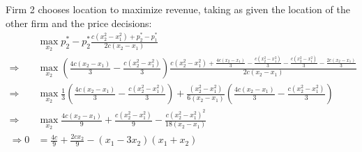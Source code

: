 \documentclass[11pt]{article} %
\begin{document}
Firm 2 chooses location to maximize revenue, taking as given the location of the other firm and the price decisions:
\begin{align*}
&\max_{x_2}  p_2^{*}-p_2^{*}\frac{c(x_2^2 - x_1^2) + p_2^{*} - p_1^{*}}{2c(x_2 - x_1)}\\
\Rightarrow&\max_{x_2}  \left(\frac{4c(x_2 - x_1)}{3} - \frac{c(x_2^2 - x_1^2)}{3}\right)\frac{c(x_2^2 - x_1^2) +  \frac{4c(x_2 - x_1)}{3} - \frac{c(x_2^2 - x_1^2)}{3} - \frac{c(x_2^2 - x_1^2)}{3} - \frac{2c(x_2 - x_1)}{3}}{2c(x_2 - x_1)}\\
\Rightarrow&\max_{x_2}  \frac{1}{3}\left(\frac{4c(x_2 - x_1)}{3} - \frac{c(x_2^2 - x_1^2)}{3}\right) + \frac{(x_2^2 - x_1^2)}{6(x_2 - x_1)}\left(\frac{4c(x_2 - x_1)}{3} - \frac{c(x_2^2 - x_1^2)}{3}\right)\\
\Rightarrow&\max_{x_2} \frac{4c(x_2 - x_1)}{9} + \frac{c(x_2^2 - x_1^2)}{9} - \frac{c(x_2^2 - x_1^2)^2}{18(x_2 - x_1)}\\
\Rightarrow 0&=\frac{4c}{9} + \frac{2cx_2}{9} - (x_1-3x_2)(x_1+x_2)
\end{align*}
\end{document}
